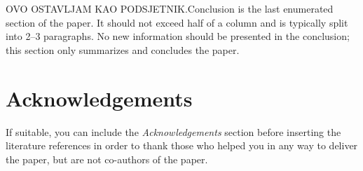 \documentclass[10pt, a4paper]{article}
\begin{document}
OVO OSTAVLJAM KAO PODSJETNIK.Conclusion is the last enumerated section of the paper. It should not exceed half of a column and is typically split into 2--3 paragraphs. No new information should be presented in the conclusion; this section only summarizes and concludes the paper.

\section*{Acknowledgements}

If suitable, you can include the \textit{Acknowledgements} section before inserting the literature references  in order to thank those who helped you in any way to deliver the paper, but are not co-authors of the paper.



\end{document}
